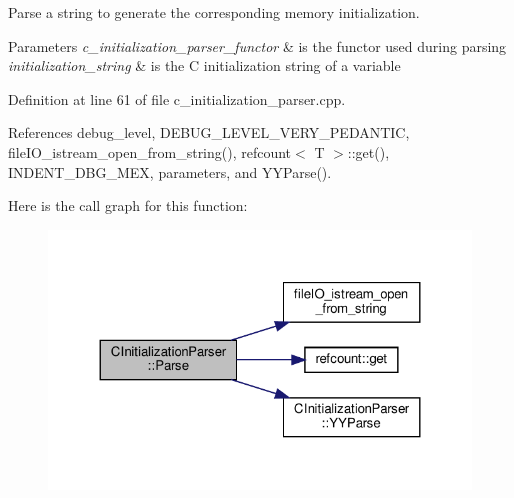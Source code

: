 Parse a string to generate the corresponding memory initialization. 


\begin{DoxyParams}{Parameters}
{\em c\+\_\+initialization\+\_\+parser\+\_\+functor} & is the functor used during parsing \\
\hline
{\em initialization\+\_\+string} & is the C initialization string of a variable \\
\hline
\end{DoxyParams}


Definition at line 61 of file c\+\_\+initialization\+\_\+parser.\+cpp.



References debug\+\_\+level, D\+E\+B\+U\+G\+\_\+\+L\+E\+V\+E\+L\+\_\+\+V\+E\+R\+Y\+\_\+\+P\+E\+D\+A\+N\+T\+IC, file\+I\+O\+\_\+istream\+\_\+open\+\_\+from\+\_\+string(), refcount$<$ T $>$\+::get(), I\+N\+D\+E\+N\+T\+\_\+\+D\+B\+G\+\_\+\+M\+EX, parameters, and Y\+Y\+Parse().

Here is the call graph for this function\+:
\nopagebreak
\begin{figure}[H]
\begin{center}
\leavevmode
\includegraphics[width=324pt]{d5/d61/classCInitializationParser_adef21cf1b94ba814a5a49ed8f25c5292_cgraph}
\end{center}
\end{figure}
\mbox{\label{classCInitializationParser_a704d7f054b52727705ba9f1d9b1c56f1}} 
